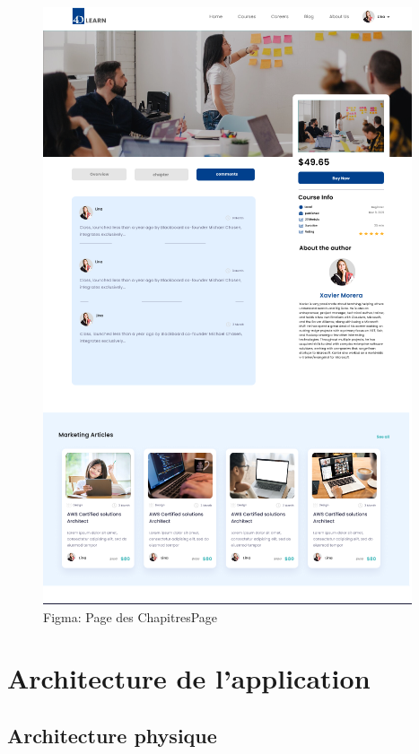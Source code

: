 \begin{figure}[H]
\begin{minipage}{0.45\textwidth}
        \includegraphics[width=\textwidth]{Figures/comment.PNG}
        \caption{Figma: Page des ChapitresPage }
    \end{minipage}
    
\end{figure}
\section{Architecture de l’application}

\subsection{Architecture physique}


